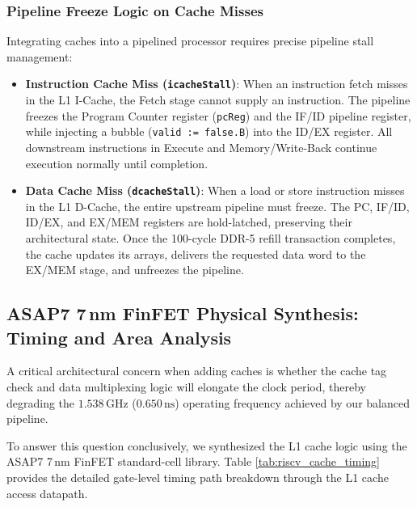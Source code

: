 \subsubsection{Pipeline Freeze Logic on Cache Misses}
Integrating caches into a pipelined processor requires precise pipeline stall management:
\begin{itemize}
    \item \textbf{Instruction Cache Miss (\texttt{icacheStall})}: When an instruction fetch misses in the L1 I-Cache, the Fetch stage cannot supply an instruction. The pipeline freezes the Program Counter register (\texttt{pcReg}) and the IF/ID pipeline register, while injecting a bubble (\texttt{valid := false.B}) into the ID/EX register. All downstream instructions in Execute and Memory/Write-Back continue execution normally until completion.
    \item \textbf{Data Cache Miss (\texttt{dcacheStall})}: When a load or store instruction misses in the L1 D-Cache, the entire upstream pipeline must freeze. The PC, IF/ID, ID/EX, and EX/MEM registers are hold-latched, preserving their architectural state. Once the 100-cycle DDR-5 refill transaction completes, the cache updates its arrays, delivers the requested data word to the EX/MEM stage, and unfreezes the pipeline.
\end{itemize}

\subsection{ASAP7 7\,nm FinFET Physical Synthesis: Timing and Area Analysis}\label{riscvCacheASAP7}

A critical architectural concern when adding caches is whether the cache tag check and data multiplexing logic will elongate the clock period, thereby degrading the $1.538\,\text{GHz}$ ($0.650\,\text{ns}$) operating frequency achieved by our balanced pipeline.

To answer this question conclusively, we synthesized the L1 cache logic using the ASAP7 7\,nm FinFET standard-cell library. Table \ref{tab:riscv_cache_timing} provides the detailed gate-level timing path breakdown through the L1 cache access datapath.

